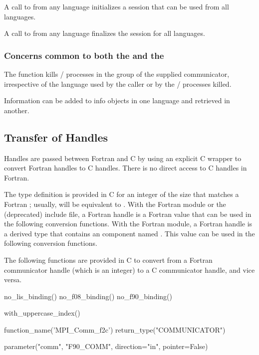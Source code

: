 A call to  from any language initializes a session that can be used from all languages.

A call to  from any language finalizes the session for all languages.

\subsubsection{Concerns common to both the \texorpdfstring{\wpm}{World Model}
and the \texorpdfstring{\spm}{Sessions Model}}

The function  kills \MPI/ processes in the group of the supplied communicator, irrespective of the language
used by the caller or by the \MPI/ processes killed.

Information can be added to info objects in one language and
retrieved in another.

\subsection{Transfer of Handles}
\label{sec:misc-handleconvert}

Handles are passed between
Fortran and C
by using an explicit C wrapper to convert
Fortran handles to C handles. There is no direct access to
C
handles in Fortran.

The type definition  is provided in
C for an
integer of the size that matches a Fortran ;
usually,  will be equivalent to
.
With the Fortran  module or the (deprecated)  include file,
a Fortran handle is a Fortran  value
that can be used in the following conversion functions.
With the Fortran  module,
a Fortran handle is a  derived type that contains
an  component named .
This  value
can be used in the following conversion functions.

The following functions are provided in C to convert from a
Fortran communicator handle (which is an integer) to a C communicator handle, and vice versa.

\begin{mpi-binding}
    no_lis_binding()
    no_f08_binding()
    no_f90_binding()

    with_uppercase_index()

    function_name('MPI_Comm_f2c')
    return_type("COMMUNICATOR")

    parameter("comm", "F90_COMM", direction="in", pointer=False)
\end{mpi-binding}

